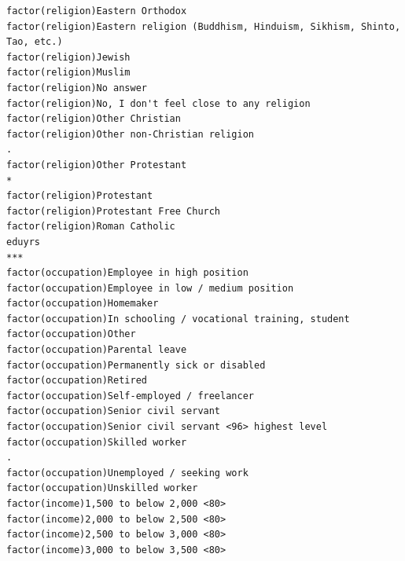 \documentclass[
]{article}
\begin{document}
\begin{table}
\begin{minipage}[t]{\linewidth}
{\begin{verbatim}
factor(religion)Eastern Orthodox                                                     
factor(religion)Eastern religion (Buddhism, Hinduism, Sikhism, Shinto, Tao, etc.)    
factor(religion)Jewish                                                               
factor(religion)Muslim                                                               
factor(religion)No answer                                                            
factor(religion)No, I don't feel close to any religion                               
factor(religion)Other Christian                                                      
factor(religion)Other non-Christian religion                                      .  
factor(religion)Other Protestant                                                  *  
factor(religion)Protestant                                                           
factor(religion)Protestant Free Church                                               
factor(religion)Roman Catholic                                                       
eduyrs                                                                            ***
factor(occupation)Employee in high position                                          
factor(occupation)Employee in low / medium position                                  
factor(occupation)Homemaker                                                          
factor(occupation)In schooling / vocational training, student                        
factor(occupation)Other                                                              
factor(occupation)Parental leave                                                     
factor(occupation)Permanently sick or disabled                                       
factor(occupation)Retired                                                            
factor(occupation)Self-employed / freelancer                                         
factor(occupation)Senior civil servant                                               
factor(occupation)Senior civil servant <96> highest level                            
factor(occupation)Skilled worker                                                  .  
factor(occupation)Unemployed / seeking work                                          
factor(occupation)Unskilled worker                                                   
factor(income)1,500 to below 2,000 <80>                                              
factor(income)2,000 to below 2,500 <80>                                              
factor(income)2,500 to below 3,000 <80>                                              
factor(income)3,000 to below 3,500 <80>                                              

\end{verbatim}}
\end{minipage}
\end{table}
\end{document}
